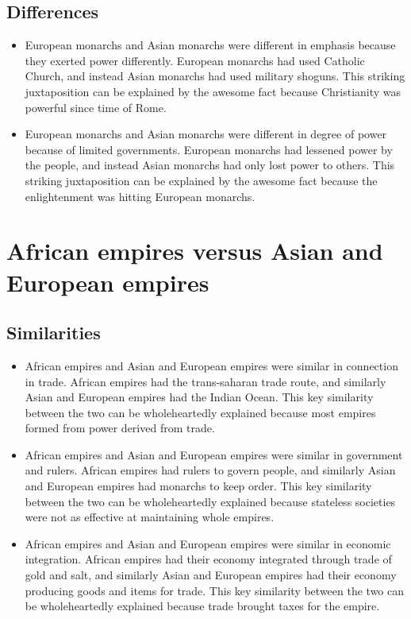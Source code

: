 \documentclass[letterpaper, 10pt]{article}
\begin{document}
            \subsection{Differences}
                \begin{itemize}
                    \item European monarchs and Asian monarchs were different in emphasis because they exerted power differently. European monarchs had used Catholic Church, and instead Asian monarchs had used military shoguns. This striking juxtaposition can be explained by the awesome fact because Christianity was powerful since time of Rome.
                    \item European monarchs and Asian monarchs were different in degree of power because of limited governments. European monarchs had lessened power by the people, and instead Asian monarchs had only lost power to others. This striking juxtaposition can be explained by the awesome fact because the enlightenment was hitting European monarchs.
                \end{itemize}
        \section{African empires versus Asian and European empires}
            \subsection{Similarities}
                \begin{itemize}
                    \item African empires and Asian and European empires were similar in connection in trade. African empires had the trans-saharan trade route, and similarly Asian and European empires had the Indian Ocean. This key similarity between the two can be wholeheartedly explained because most empires formed from power derived from trade.
                    \item African empires and Asian and European empires were similar in government and rulers. African empires had rulers to govern people, and similarly Asian and European empires had monarchs to keep order. This key similarity between the two can be wholeheartedly explained because stateless societies were not as effective at maintaining whole empires.
                    \item African empires and Asian and European empires were similar in economic integration. African empires had their economy integrated through trade of gold and salt, and similarly Asian and European empires had their economy producing goods and items for trade. This key similarity between the two can be wholeheartedly explained because trade brought taxes for the empire.
                \end{itemize}
\end{document}
